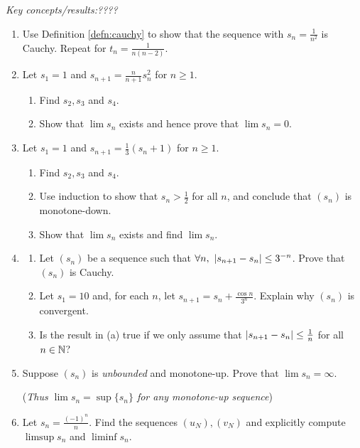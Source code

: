 \begin{exercises}{}{}
	\emph{Key concepts/results:\quad ????}

	\begin{enumerate}
	  \item Use Definition \ref{defn:cauchy} to show that the sequence with $s_n=\frac 1{n^2}$ is Cauchy. Repeat for $t_n=\frac 1{n(n-2)}$.
	  
	  \item%
	  Let $s_1=1$ and $s_{n+1}=\frac n{n+1}s_n^2$ for $n\ge 1$.
	  \begin{enumerate}
		  \item Find $s_2, s_3$ and $s_4$.
		  \item Show that $\lim s_n$ exists and hence prove that $\lim s_n=0$.
	  \end{enumerate}
	  
	  
	  \item%
	  Let $s_1=1$ and $s_{n+1}=\frac 13(s_n+1)$ for $n\ge 1$.
	  \begin{enumerate}
		  \item Find $s_2, s_3$ and $s_4$.
		  \item Use induction to show that $s_n>\frac 12$ for all $n$, and conclude that $(s_n)$ is monotone-down.
		  \item Show that $\lim s_n$ exists and find $\lim s_n$.
	  \end{enumerate}
	  
	  
	  \item%
	  \begin{enumerate}
	  	\item Let $(s_n)$ be a sequence such that $\forall n,\ \nm{s_{n+1}-s_n}\le 3^{-n}$. Prove that $(s_n)$ is Cauchy.
	  	\item Let $s_1=10$ and, for each $n$, let $s_{n+1}=s_n+\frac{\cos n}{3^n}$. Explain why $(s_n)$ is convergent.
	  	\item Is the result in (a) true if we only assume that $\left| s_{n+1}-s_n\right|\le \frac 1n$ for all $n\in\mathbb{N}$?
	  \end{enumerate}
	  
	    
	  \item\label{exs:unbddmonotone} Suppose $(s_n)$ is \emph{unbounded} and monotone-up. Prove that $\lim s_n=\infty$.\par
	  (\emph{Thus $\lim s_n=\sup\{s_n\}$ for any monotone-up sequence}) 
	  
	
		\item Let $s_n=\frac{(-1)^n}n$. Find the sequences $(u_N),(v_N)$ and explicitly compute $\limsup s_n$ and $\liminf s_n$.
	  

\end{enumerate}
\end{exercises}

